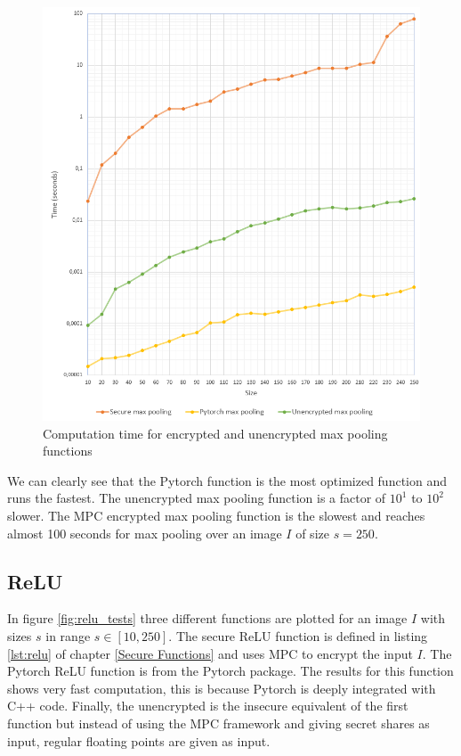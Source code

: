 \begin{figure}[H]
  \includegraphics[scale=0.7]{fig/maxpooling_test.png}
  \centering
  \caption{Computation time for encrypted and unencrypted max pooling functions}
  \label{fig:maxpooling_test}
\end{figure}

We can clearly see that the Pytorch function is the most optimized function and runs the fastest. The unencrypted max pooling function is a factor of $10^1$ to $10^2$ slower. The MPC encrypted max pooling function is the slowest and reaches almost 100 seconds for max pooling over an image $I$ of size $s = 250$.

\subsection{ReLU}
In figure \ref{fig:relu_tests} three different functions are plotted for an image $I$ with sizes $s$ in range $s \in [10,250]$. The secure ReLU function is defined in listing \ref{lst:relu} of chapter \ref{Secure Functions} and uses MPC to encrypt the input $I$. The Pytorch ReLU function is  from the Pytorch package. The results for this function shows very fast computation, this is because Pytorch is deeply integrated with C++ code. Finally, the unencrypted is the insecure equivalent of the first function but instead of using the MPC framework and giving secret shares as input, regular floating points are given as input.

